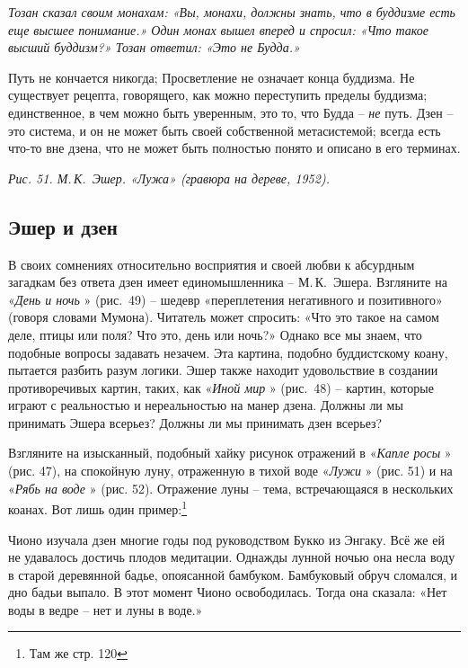 \documentclass[../main.tex]{subfiles}
\begin{document}
\emph{Тозан сказал своим монахам: «Вы, монахи, должны знать, что в буддизме есть еще высшее понимание.» Один монах вышел вперед и спросил: «Что такое высший буддизм?» Тозан ответил: «Это не Будда.»}

Путь не кончается никогда; Просветление не означает конца буддизма. Не существует рецепта, говорящего, как можно переступить пределы буддизма; единственное, в чем можно быть уверенным, это то, что Будда \--- \emph{не} путь. Дзен \--- это система, и он не может быть своей собственной метасистемой; всегда есть что-то вне дзена, что не может быть полностью понято и описано в его терминах.

\emph{Рис. 51. М.\,К.~Эшер. «Лужа» (гравюра на дереве, 1952).}


\subsection{Эшер и дзен}

В своих сомнениях относительно восприятия и своей любви к абсурдным загадкам без ответа дзен имеет единомышленника \--- М.\,К.~Эшера. Взгляните на «\emph{День и ночь} » (рис.~49) \--- шедевр «переплетения негативного и позитивного» (говоря словами Мумона). Читатель может спросить: «Что это такое на самом деле, птицы или поля? Что это, день или ночь?» Однако все мы знаем, что подобные вопросы задавать незачем. Эта картина, подобно буддистскому коану, пытается разбить разум логики. Эшер также находит удовольствие в создании противоречивых картин, таких, как «\emph{Иной мир} » (рис.~48) \--- картин, которые играют с реальностью и нереальностью на манер дзена. Должны ли мы принимать Эшера всерьез? Должны ли мы принимать дзен всерьез?

Взгляните на изысканный, подобный хайку рисунок отражений в «\emph{Капле росы} » (рис. 47), на спокойную луну, отраженную в тихой воде «\emph{Лужи} » (рис. 51) и на «\emph{Рябь на воде} » (рис. 52). Отражение луны \--- тема, встречающаяся в нескольких коанах. Вот лишь один пример:\footnote{Там же стр. 120}

\begin{koan}
    Чионо изучала дзен многие годы под руководством Букко из Энгаку. Всё же ей не удавалось достичь плодов медитации. Однажды лунной ночью она несла воду в старой деревянной бадье, опоясанной бамбуком. Бамбуковый обруч сломался, и дно бадьи выпало. В этот момент Чионо освободилась. Тогда она сказала: «Нет воды в ведре \--- нет и луны в воде.»
\end{koan}
\end{document}
